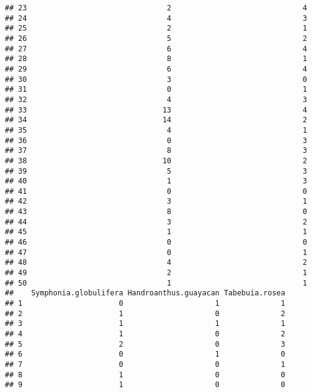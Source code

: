 \documentclass[
]{article}
\begin{document}
\begin{verbatim}
## 23                                2                              4
## 24                                4                              3
## 25                                2                              1
## 26                                5                              2
## 27                                6                              4
## 28                                8                              1
## 29                                6                              4
## 30                                3                              0
## 31                                0                              1
## 32                                4                              3
## 33                               13                              4
## 34                               14                              2
## 35                                4                              1
## 36                                0                              3
## 37                                8                              3
## 38                               10                              2
## 39                                5                              3
## 40                                1                              3
## 41                                0                              0
## 42                                3                              1
## 43                                8                              0
## 44                                3                              2
## 45                                1                              1
## 46                                0                              0
## 47                                0                              1
## 48                                4                              2
## 49                                2                              1
## 50                                1                              1
##    Symphonia.globulifera Handroanthus.guayacan Tabebuia.rosea
## 1                      0                     1              1
## 2                      1                     0              2
## 3                      1                     1              1
## 4                      1                     0              2
## 5                      2                     0              3
## 6                      0                     1              0
## 7                      0                     0              1
## 8                      1                     0              0
## 9                      1                     0              0

\end{verbatim}
\end{document}
